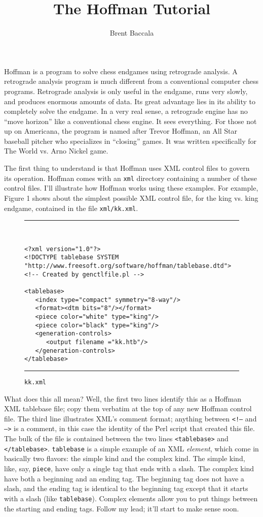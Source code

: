 \documentclass[11pt]{article}
\title{The Hoffman Tutorial}
\author{Brent Baccala}
\begin{document}
\maketitle

\parindent 0pt
\parskip 12pt

Hoffman is a program to solve chess endgames using retrograde
analysis.
A retrograde analysis program is much different from a conventional
computer chess programs.  Retrograde analysis is only useful in the
endgame, runs very slowly, and produces enormous amounts of data.  Its
great advantage lies in its ability to completely solve the endgame.
In a very real sense, a retrograde engine has no ``move horizon'' like a
conventional chess engine.  It sees everything.
For those not up on Americana, the program is named after
Trevor Hoffman, an All Star baseball pitcher who specializes in
``closing'' games.  It was written specifically for The World vs. Arno
Nickel game.

The first thing to understand is that Hoffman uses XML
control files to govern its operation.
Hoffman comes with an {\tt xml} directory containing a number of
these control files.  I'll illustrate how Hoffman works using these
examples.
For example, Figure 1 shows about the simplest possible XML control file, for
the king vs. king endgame, contained in the file {\tt xml/kk.xml}.


\begin{figure}
\hrule\ 
{\small\begin{verbatim}
<?xml version="1.0"?>
<!DOCTYPE tablebase SYSTEM "http://www.freesoft.org/software/hoffman/tablebase.dtd">
<!-- Created by genctlfile.pl -->

<tablebase>
   <index type="compact" symmetry="8-way"/>
   <format><dtm bits="8"/></format>
   <piece color="white" type="king"/>
   <piece color="black" type="king"/>
   <generation-controls>
      <output filename ="kk.htb"/>
   </generation-controls>
</tablebase>
\end{verbatim}}
\hrule
\caption{\tt kk.xml}
\end{figure}

What does this all mean?  Well, the first two lines identify this as a
Hoffman XML tablebase file; copy them verbatim at the top of any new
Hoffman control file.  The third line illustrates XML's comment
format; anything between {\tt <!--} and {\tt -->} is a comment, in
this case the identity of the Perl script that created this file. The
bulk of the file is contained between the two lines {\tt <tablebase>}
and {\tt </tablebase>}.  {\tt tablebase} is a simple example of an XML
{\it element}, which come in basically two flavors: the simple kind
and the complex kind.  The simple kind, like, say, {\tt piece}, have
only a single tag that ends with a slash.  The complex kind have both
a beginning and an ending tag.  The beginning tag does not have a
slash, and the ending tag is identical to the beginning tag except
that it starts with a slash (like {\tt tablebase}).  Complex elements
allow you to put things between the starting and ending tags.  Follow
my lead; it'll start to make sense soon.
\end{document}
